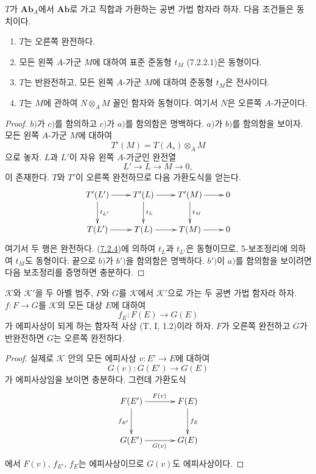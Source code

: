 \begin{proposition}[7.2.5]
\label{III.7.2.5-fr}
$T$가 $\mathbf{Ab}_A$에서 $\mathbf{Ab}$로 가고 직합과 가환하는 공변
가법 함자라 하자. 다음 조건들은 동치이다.
\begin{enumerate}
  \item[a)] $T$는 오른쪽 완전하다.
  \item[b)] 모든 왼쪽 $A$-가군 $M$에 대하여 표준 준동형 $t_M$
    (7.2.2.1)은 동형이다.
  \item[$b'$)] $T$는 반완전하고, 모든 왼쪽 $A$-가군 $M$에 대하여
    준동형 $t_M$은 전사이다.
  \item[c)] $T$는 $M$에 관하여 $N\otimes_A M$ 꼴인 함자와 동형이다.
    여기서 $N$은 오른쪽 $A$-가군이다.
\end{enumerate}
\end{proposition}

\begin{proof}
$b)$가 $c)$를 함의하고 $c)$가 $a)$를 함의함은 명백하다. $a)$가
$b)$를 함의함을 보이자.
모든 왼쪽 $A$-가군 $M$에 대하여
\[
  T'(M)=T(A_s)\otimes_A M
\]
으로 놓자. $L$과 $L'$이 자유 왼쪽 $A$-가군인 완전열
\[
  L'\longrightarrow L\longrightarrow M\longrightarrow0,
\]
이 존재한다. $T$와 $T'$이 오른쪽 완전하므로 다음 가환도식을 얻는다.
\[
\xymatrix@C=22pt@R=25pt{
  T'(L')\ar[r]\ar[d]^{t_{L'}}
  &
  T'(L)\ar[r]\ar[d]^{t_L}
  &
  T'(M)\ar[r]\ar[d]^{t_M}
  &
  0
  \\
  T(L')\ar[r]
  &
  T(L)\ar[r]
  &
  T(M)\ar[r]
  &
  0
}
\]
여기서 두 행은 완전하다. (\hyperref[III.7.2.4-fr]{7.2.4})에 의하여
$t_L$과 $t_{L'}$은 동형이므로, 5-보조정리에 의하여 $t_M$도
동형이다. 끝으로 $b)$가 $b')$을 함의함은 명백하다. $b')$이 $a)$를
함의함을 보이려면 다음 보조정리를 증명하면 충분하다.
\end{proof}

\begin{lemma}[7.2.5.1]
\label{III.7.2.5.1-fr}
$\mathcal K$와 $\mathcal K'$을 두 아벨 범주, $F$와 $G$를
$\mathcal K$에서 $\mathcal K'$으로 가는 두 공변 가법 함자라 하자.
$f:F\to G$를 $\mathcal K$의 모든 대상 $E$에 대하여
\[
  f_E:F(E)\longrightarrow G(E)
\]
가 에피사상이 되게 하는 함자적 사상 (T, I, 1.2)이라 하자. $F$가
오른쪽 완전하고 $G$가 반완전하면 $G$는 오른쪽 완전하다.
\end{lemma}

\begin{proof}
실제로 $\mathcal K$ 안의 모든 에피사상 $v:E'\to E$에 대하여
\[
  G(v):G(E')\longrightarrow G(E)
\]
가 에피사상임을 보이면 충분하다. 그런데 가환도식
\[
\xymatrix@C=35pt@R=30pt{
  F(E')\ar[r]^{F(v)}\ar[d]_{f_{E'}}
  &
  F(E)\ar[d]^{f_E}
  \\
  G(E')\ar[r]_{G(v)}
  &
  G(E)
}
\]
에서 $F(v)$, $f_{E'}$, $f_E$는 에피사상이므로 $G(v)$도
에피사상이다.
\end{proof}

